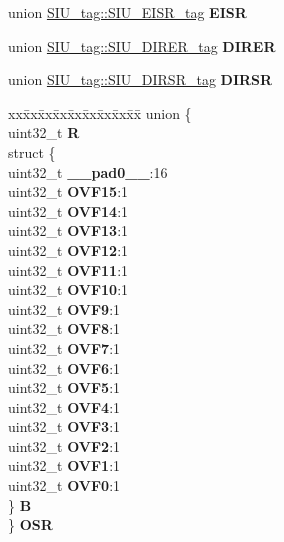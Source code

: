 \begin{DoxyCompactItemize}
\begin{tabbing}
\end{tabbing}\item 
\mbox{\label{structSIU__tag_a4adca6f0a772ca99890298a69b6b6ccd}} 
union \mbox{\hyperlink{unionSIU__tag_1_1SIU__EISR__tag}{S\+I\+U\+\_\+tag\+::\+S\+I\+U\+\_\+\+E\+I\+S\+R\+\_\+tag}} {\bfseries E\+I\+SR}
\item 
\mbox{\label{structSIU__tag_a409af7545fc1c196a927d8759f599f20}} 
union \mbox{\hyperlink{unionSIU__tag_1_1SIU__DIRER__tag}{S\+I\+U\+\_\+tag\+::\+S\+I\+U\+\_\+\+D\+I\+R\+E\+R\+\_\+tag}} {\bfseries D\+I\+R\+ER}
\item 
\mbox{\label{structSIU__tag_a653e360cdcfa0d6a987d681e8b20e2a5}} 
union \mbox{\hyperlink{unionSIU__tag_1_1SIU__DIRSR__tag}{S\+I\+U\+\_\+tag\+::\+S\+I\+U\+\_\+\+D\+I\+R\+S\+R\+\_\+tag}} {\bfseries D\+I\+R\+SR}
\item 
\mbox{\label{structSIU__tag_af805073f5ec0693899cc1acd37b882d5}} 
\begin{tabbing}
xx\=xx\=xx\=xx\=xx\=xx\=xx\=xx\=xx\=\kill
union \{\\
\>uint32\_t {\bfseries R}\\
\>struct \{\\
\>\>uint32\_t {\bfseries \_\_pad0\_\_}:16\\
\>\>uint32\_t {\bfseries OVF15}:1\\
\>\>uint32\_t {\bfseries OVF14}:1\\
\>\>uint32\_t {\bfseries OVF13}:1\\
\>\>uint32\_t {\bfseries OVF12}:1\\
\>\>uint32\_t {\bfseries OVF11}:1\\
\>\>uint32\_t {\bfseries OVF10}:1\\
\>\>uint32\_t {\bfseries OVF9}:1\\
\>\>uint32\_t {\bfseries OVF8}:1\\
\>\>uint32\_t {\bfseries OVF7}:1\\
\>\>uint32\_t {\bfseries OVF6}:1\\
\>\>uint32\_t {\bfseries OVF5}:1\\
\>\>uint32\_t {\bfseries OVF4}:1\\
\>\>uint32\_t {\bfseries OVF3}:1\\
\>\>uint32\_t {\bfseries OVF2}:1\\
\>\>uint32\_t {\bfseries OVF1}:1\\
\>\>uint32\_t {\bfseries OVF0}:1\\
\>\} {\bfseries B}\\
\} {\bfseries OSR}\\


\end{tabbing}
\end{DoxyCompactItemize}
